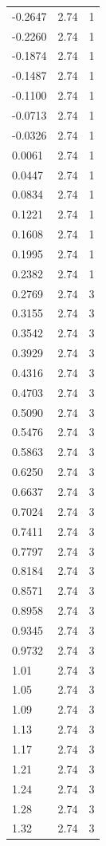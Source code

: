 \begin{longtable}{lrr}
  -0.2647 & 2.74 & 1 \\
  -0.2260 & 2.74 & 1 \\
  -0.1874 & 2.74 & 1 \\
  -0.1487 & 2.74 & 1 \\
  -0.1100 & 2.74 & 1 \\
  -0.0713 & 2.74 & 1 \\
  -0.0326 & 2.74 & 1 \\
  0.0061 & 2.74 & 1 \\
  0.0447 & 2.74 & 1 \\
  0.0834 & 2.74 & 1 \\
  0.1221 & 2.74 & 1 \\
  0.1608 & 2.74 & 1 \\
  0.1995 & 2.74 & 1 \\
  0.2382 & 2.74 & 1 \\
  0.2769 & 2.74 & 3 \\
  0.3155 & 2.74 & 3 \\
  0.3542 & 2.74 & 3 \\
  0.3929 & 2.74 & 3 \\
  0.4316 & 2.74 & 3 \\
  0.4703 & 2.74 & 3 \\
  0.5090 & 2.74 & 3 \\
  0.5476 & 2.74 & 3 \\
  0.5863 & 2.74 & 3 \\
  0.6250 & 2.74 & 3 \\
  0.6637 & 2.74 & 3 \\
  0.7024 & 2.74 & 3 \\
  0.7411 & 2.74 & 3 \\
  0.7797 & 2.74 & 3 \\
  0.8184 & 2.74 & 3 \\
  0.8571 & 2.74 & 3 \\
  0.8958 & 2.74 & 3 \\
  0.9345 & 2.74 & 3 \\
  0.9732 & 2.74 & 3 \\
  1.01 & 2.74 & 3 \\
  1.05 & 2.74 & 3 \\
  1.09 & 2.74 & 3 \\
  1.13 & 2.74 & 3 \\
  1.17 & 2.74 & 3 \\
  1.21 & 2.74 & 3 \\
  1.24 & 2.74 & 3 \\
  1.28 & 2.74 & 3 \\
  1.32 & 2.74 & 3 \\

\end{longtable}
